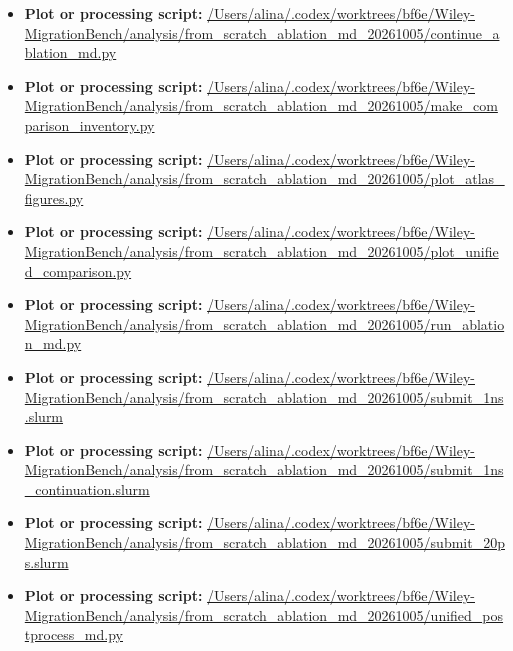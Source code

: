 \begin{itemize}[leftmargin=1.4em,noitemsep]
\item \textbf{Plot or processing script:} \url{/Users/alina/.codex/worktrees/bf6e/Wiley-MigrationBench/analysis/from_scratch_ablation_md_20261005/continue_ablation_md.py}
\item \textbf{Plot or processing script:} \url{/Users/alina/.codex/worktrees/bf6e/Wiley-MigrationBench/analysis/from_scratch_ablation_md_20261005/make_comparison_inventory.py}
\item \textbf{Plot or processing script:} \url{/Users/alina/.codex/worktrees/bf6e/Wiley-MigrationBench/analysis/from_scratch_ablation_md_20261005/plot_atlas_figures.py}
\item \textbf{Plot or processing script:} \url{/Users/alina/.codex/worktrees/bf6e/Wiley-MigrationBench/analysis/from_scratch_ablation_md_20261005/plot_unified_comparison.py}
\item \textbf{Plot or processing script:} \url{/Users/alina/.codex/worktrees/bf6e/Wiley-MigrationBench/analysis/from_scratch_ablation_md_20261005/run_ablation_md.py}
\item \textbf{Plot or processing script:} \url{/Users/alina/.codex/worktrees/bf6e/Wiley-MigrationBench/analysis/from_scratch_ablation_md_20261005/submit_1ns.slurm}
\item \textbf{Plot or processing script:} \url{/Users/alina/.codex/worktrees/bf6e/Wiley-MigrationBench/analysis/from_scratch_ablation_md_20261005/submit_1ns_continuation.slurm}
\item \textbf{Plot or processing script:} \url{/Users/alina/.codex/worktrees/bf6e/Wiley-MigrationBench/analysis/from_scratch_ablation_md_20261005/submit_20ps.slurm}
\item \textbf{Plot or processing script:} \url{/Users/alina/.codex/worktrees/bf6e/Wiley-MigrationBench/analysis/from_scratch_ablation_md_20261005/unified_postprocess_md.py}
\end{itemize}
